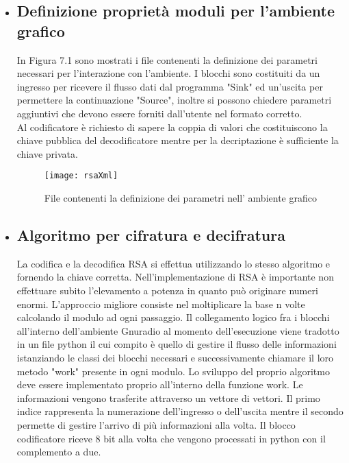 \begin{itemize}

\item \subsection{Definizione proprietà moduli per l'ambiente grafico}
In Figura 7.1 sono mostrati i file contenenti la definizione dei parametri necessari per l'interazione con l'ambiente. I blocchi sono costituiti da un ingresso per ricevere il flusso dati dal programma "Sink" ed un'uscita per permettere la continuazione "Source", inoltre si possono chiedere parametri aggiuntivi che devono essere forniti dall'utente nel formato corretto.
\\Al codificatore è richiesto  di sapere la coppia di valori che costituiscono la chiave pubblica del decodificatore mentre per la decriptazione è sufficiente la chiave privata.
\begin{figure}[h]
	\raggedleft
	\texttt{[image: rsaXml]}
	\caption{File contenenti la definizione dei parametri nell' ambiente grafico}
\end{figure}
\item \subsection{Algoritmo per cifratura e decifratura}
La codifica e la decodifica RSA si effettua utilizzando lo stesso algoritmo e fornendo la chiave corretta. Nell'implementazione di RSA è importante non effettuare subito l'elevamento a potenza in quanto può originare numeri enormi. L'approccio migliore consiste nel  moltiplicare la base n volte calcolando il modulo ad ogni passaggio.
Il collegamento logico fra i blocchi all'interno dell'ambiente Gnuradio al momento dell'esecuzione viene tradotto in un file python il cui compito è quello di gestire il flusso delle informazioni istanziando le classi dei blocchi necessari e successivamente chiamare il loro metodo "work" presente in ogni modulo.
 Lo sviluppo del proprio algoritmo deve essere implementato proprio all'interno della funzione work.
 Le informazioni vengono trasferite attraverso un vettore di vettori. Il primo indice rappresenta la numerazione dell'ingresso o dell'uscita mentre il secondo permette di gestire l'arrivo di più informazioni alla volta.
Il blocco codificatore riceve 8 bit alla volta che vengono processati in python con il complemento a due. 
\begin{figure}[h]
	\centering

\end{figure}
\end{itemize}
